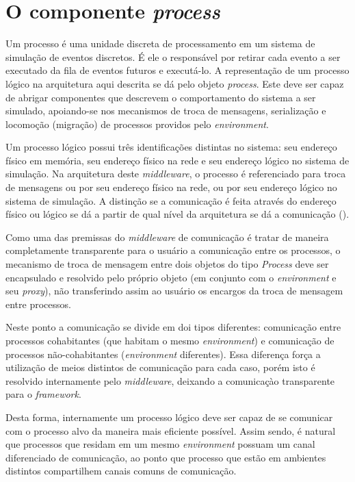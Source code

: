\section{O componente \textit{process} \label{process}}

Um processo é uma unidade discreta de processamento em um sistema de simulação de eventos discretos. É ele o responsável por retirar cada evento a ser executado da fila de eventos futuros e executá-lo. A representação de um processo lógico na arquitetura aqui descrita se dá pelo objeto \textit{process}. Este deve ser capaz de abrigar componentes que descrevem o comportamento do sistema a ser simulado, apoiando-se nos mecanismos de troca de mensagens, serialização e locomoção (migração) de processos providos pelo \textit{environment}.

Um processo lógico possui três identificações distintas no sistema: seu endereço físico em memória, seu endereço físico na rede e seu endereço lógico no sistema de simulação. Na arquitetura deste \textit{middleware}, o processo é referenciado para troca de mensagens ou por seu endereço físico na rede, ou por seu endereço lógico no sistema de simulação. A distinção se a comunicação é feita através do endereço físico ou lógico se dá a partir de qual nível da arquitetura se dá a comunicação ().

Como uma das premissas do \textit{middleware} de comunicação é tratar de maneira completamente transparente para o usuário a comunicação entre os processos, o mecanismo de troca de mensagem entre dois objetos do tipo \textit{Process} deve ser encapsulado e resolvido pelo próprio objeto (em conjunto com o \textit{environment} e seu \textit{proxy}), não transferindo assim ao usuário os encargos da troca de mensagem entre processos.

Neste ponto a comunicação se divide em doi tipos diferentes: comunicação entre processos cohabitantes (que habitam o mesmo \textit{environment}) e comunicação de processos não-cohabitantes (\textit{environment} diferentes). Essa diferença força a utilização de meios distintos de comunicação para cada caso, porém isto é resolvido internamente pelo \textit{middleware}, deixando a comunicaçào transparente para o \textit{framework}.

Desta forma, internamente um processo lógico deve ser capaz de se comunicar com o processo alvo da maneira mais eficiente possível. Assim sendo, é natural que processos que residam em um mesmo \textit{environment} possuam um canal diferenciado de comunicação, ao ponto que processo que estão em ambientes distintos compartilhem canais comuns de comunicação.

